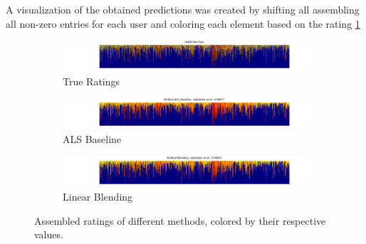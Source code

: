 A visualization of the obtained predictions was created by shifting all
assembling all non-zero entries for each user and coloring each element
based on the rating \ref{fig:matrix}

\begin{figure}[!tbp]
  \begin{subfigure}[b]{0.99\columnwidth}
    \includegraphics[width=.99\columnwidth]{figures/matrix_validation.png}
    \vspace{-3mm}
    \caption{True Ratings}
  \end{subfigure}
  \hfill
  \begin{subfigure}[b]{0.99\columnwidth}
    \includegraphics[width=.99\columnwidth]{figures/matrix_validation_1.png}
    \vspace{-3mm}
    \caption{ALS Baseline}
  \end{subfigure}
  \begin{subfigure}[b]{0.99\columnwidth}
    \includegraphics[width=.99\columnwidth]{figures/matrix_blending.png}
    \vspace{-3mm}
    \caption{Linear Blending}
  \end{subfigure}
  \caption{Assembled ratings of different methods, colored by their respective
  values.}
  \label{fig:matrix}
\end{figure}
